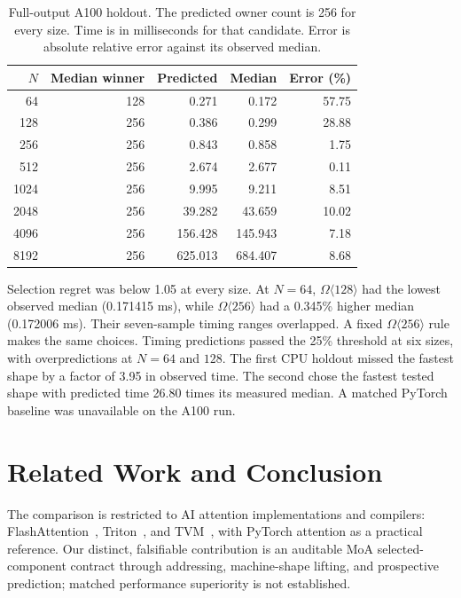 \documentclass[sigplan,10pt,review,anonymous,balance=false,pbalance=false]{acmart}
\begin{document}
\begin{table}[t]
\centering\footnotesize
\caption{Full-output A100 holdout. The predicted owner count is 256 for every size. Time is in milliseconds for that candidate. Error is absolute relative error against its observed median.}\label{tab:full-a100}
\begin{tabular}{@{}rrrrr@{}}\toprule
$N$ & Median winner & Predicted & Median & Error (\%)\\\midrule
64 & 128 & 0.271 & 0.172 & 57.75 \\
128 & 256 & 0.386 & 0.299 & 28.88 \\
256 & 256 & 0.843 & 0.858 & 1.75 \\
512 & 256 & 2.674 & 2.677 & 0.11 \\
1024 & 256 & 9.995 & 9.211 & 8.51 \\
2048 & 256 & 39.282 & 43.659 & 10.02 \\
4096 & 256 & 156.428 & 145.943 & 7.18 \\
8192 & 256 & 625.013 & 684.407 & 8.68 \\
\bottomrule
\end{tabular}
\end{table}

Selection regret was below 1.05 at every size. At $N=64$, $\Omega\langle128\rangle$ had the lowest observed median (0.171415 ms), while $\Omega\langle256\rangle$ had a 0.345\% higher median (0.172006 ms). Their seven-sample timing ranges overlapped. A fixed $\Omega\langle256\rangle$ rule makes the same choices. Timing predictions passed the 25\% threshold at six sizes, with overpredictions at $N=64$ and $128$. The first CPU holdout missed the fastest shape by a factor of 3.95 in observed time. The second chose the fastest tested shape with predicted time 26.80 times its measured median. A matched PyTorch baseline was unavailable on the A100 run.

\section{Related Work and Conclusion}
The comparison is restricted to AI attention implementations and compilers: FlashAttention~\cite{flash,flash2}, Triton~\cite{triton}, and TVM~\cite{tvm}, with PyTorch attention as a practical reference. Our distinct, falsifiable contribution is an auditable MoA selected-component contract through addressing, machine-shape lifting, and prospective prediction; matched performance superiority is not established.
\end{document}
